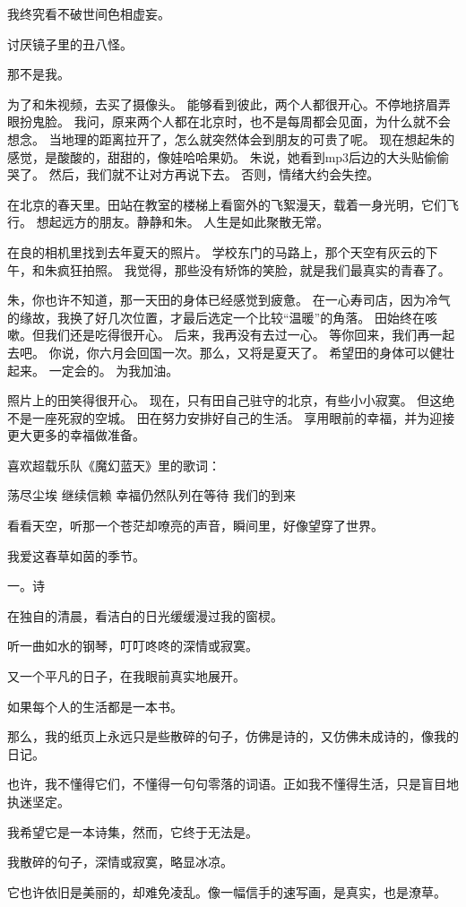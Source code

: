 \documentclass[12pt,a4paper]{article}
\newcommand{\subpart}[1]{
	\begingroup \par
	\vspace{1ex} \centering #1
	\par \endgroup
}
\begin{document}
		我终究看不破世间色相虚妄。\par
		讨厌镜子里的丑八怪。\par
		那不是我。

	\endwriting



		为了和朱视频，去买了摄像头。
		能够看到彼此，两个人都很开心。不停地挤眉弄眼扮鬼脸。
		我问，原来两个人都在北京时，也不是每周都会见面，为什么就不会想念。
		当地理的距离拉开了，怎么就突然体会到朋友的可贵了呢。
		现在想起朱的感觉，是酸酸的，甜甜的，像娃哈哈果奶。
		朱说，她看到mp3后边的大头贴偷偷哭了。
		然后，我们就不让对方再说下去。
		否则，情绪大约会失控。

		在北京的春天里。田站在教室的楼梯上看窗外的飞絮漫天，载着一身光明，它们飞行。
		想起远方的朋友。静静和朱。
		人生是如此聚散无常。

		在良的相机里找到去年夏天的照片。
		学校东门的马路上，那个天空有灰云的下午，和朱疯狂拍照。
		我觉得，那些没有矫饰的笑脸，就是我们最真实的青春了。


		朱，你也许不知道，那一天田的身体已经感觉到疲惫。
		在一心寿司店，因为冷气的缘故，我换了好几次位置，才最后选定一个比较“温暖”的角落。
		田始终在咳嗽。但我们还是吃得很开心。
		后来，我再没有去过一心。
		等你回来，我们再一起去吧。
		你说，你六月会回国一次。那么，又将是夏天了。
		希望田的身体可以健壮起来。
		一定会的。
		为我加油。


		照片上的田笑得很开心。
		现在，只有田自己驻守的北京，有些小小寂寞。
		但这绝不是一座死寂的空城。
		田在努力安排好自己的生活。
		享用眼前的幸福，并为迎接更大更多的幸福做准备。

		喜欢超载乐队《魔幻蓝天》里的歌词：

		荡尽尘埃
		继续信赖
		幸福仍然队列在等待
		我们的到来

		看看天空，听那一个苍茫却嘹亮的声音，瞬间里，好像望穿了世界。

	\endwriting



		我爱这春草如茵的季节。

		\subpart{一。诗}

		在独自的清晨，看洁白的日光缓缓漫过我的窗棂。\par
		听一曲如水的钢琴，叮叮咚咚的深情或寂寞。\par
		又一个平凡的日子，在我眼前真实地展开。

		如果每个人的生活都是一本书。\par
		那么，我的纸页上永远只是些散碎的句子，仿佛是诗的，又仿佛未成诗的，像我的日记。\par
		也许，我不懂得它们，不懂得一句句零落的词语。正如我不懂得生活，只是盲目地执迷坚定。\par
		我希望它是一本诗集，然而，它终于无法是。\par
		我散碎的句子，深情或寂寞，略显冰凉。\par
		它也许依旧是美丽的，却难免凌乱。像一幅信手的速写画，是真实，也是潦草。
\end{document}
